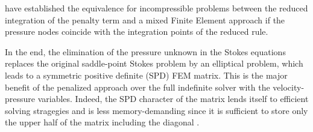 \cite{mahu78} have established the equivalence for incompressible problems between the reduced integration
of the penalty term and a mixed Finite Element approach if the pressure nodes coincide with the integration points of the reduced rule.

In the end, the elimination of the pressure unknown in the Stokes equations
replaces the original saddle-point Stokes problem \cite{begl05} by an elliptical problem, 
which leads to a symmetric positive definite (SPD) FEM matrix. 
This is the major benefit of the penalized approach 
over the full indefinite solver with the velocity-pressure variables. Indeed, the SPD character of the matrix lends itself 
to efficient solving stragegies and is less memory-demanding since it is sufficient to store only the upper half of the matrix including the diagonal
\cite{gova}
.


